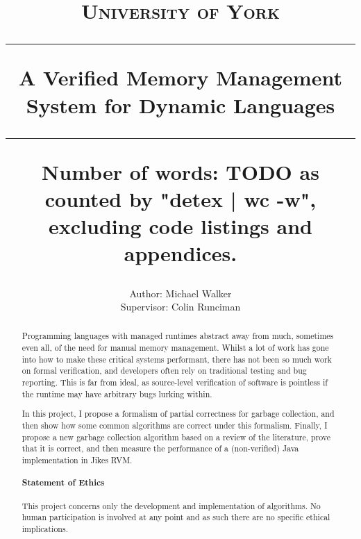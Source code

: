 \documentclass[10pt,a4paper,twoside,openright]{report}
\title{%
{\normalsize\scshape University of York}\\
\vspace{2em}
\hrule
\vspace{1em}
{\huge\bfseries A Verified Memory Management System for Dynamic Languages}\\
\vspace{1em}
\hrule
\vfill%
{\normalsize Number of words: TODO as counted by "detex | wc -w",\\
excluding code listings and appendices.}
}
\author{%
Author: Michael Walker\\
Supervisor: Colin Runciman
}
\date{}
\begin{document}
\pagestyle{empty}

\maketitle

\cleardoublepage
\begin{abstract}
Programming languages with managed runtimes abstract away from much,
sometimes even all, of the need for manual memory management. Whilst
a lot of work has gone into how to make these critical systems
performant, there has not been so much work on formal verification,
and developers often rely on traditional testing and bug
reporting. This is far from ideal, as source-level verification of
software is pointless if the runtime may have arbitrary bugs lurking
within.

In this project, I propose a formalism of partial correctness for
garbage collection, and then show how some common algorithms are
correct under this formalism. Finally, I propose a new garbage
collection algorithm based on a review of the literature, prove that
it is correct, and then measure the performance of a (non-verified)
Java implementation in Jikes RVM.  \vfill

\paragraph{Statement of Ethics}

This project concerns only the development and implementation of
algorithms. No human participation is involved at any point and as
such there are no specific ethical implications.
\end{abstract}


\cleardoublepage
\pagestyle{plain}
\setcounter{page}{1}
\tableofcontents


\newpage
\cleardoublepage
{}











\end{document}
